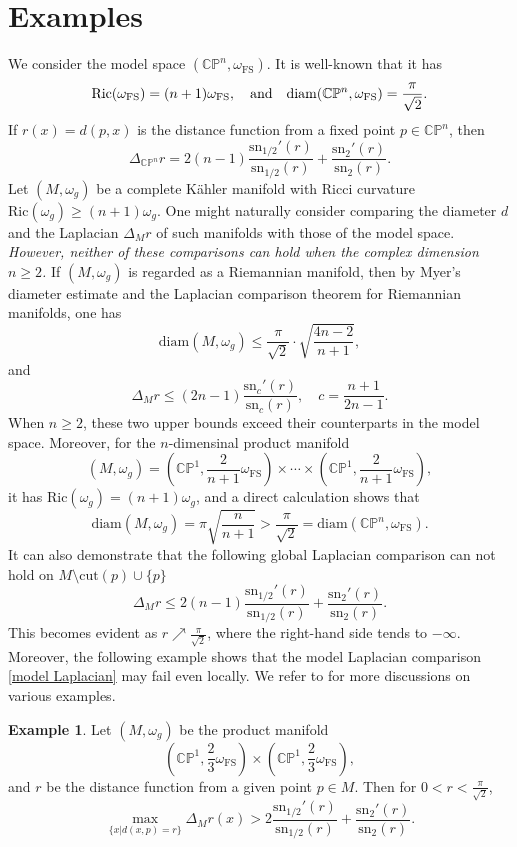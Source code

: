 \documentclass[12pt,reqno]{amsart}
\theoremstyle{plain}
\theoremstyle{definition}
\newtheorem{example}[thm]{Example}
\newcommand{\eexample}{\end{example}}
\newcommand{\bexample}{\begin{example}}
\newcommand{\beq}{\begin{equation}}
\newcommand{\eeq}{\end{equation}}
\newcommand{\qtq}[1]{\quad\mbox{#1}\quad}
\renewcommand{\>}{\rightarrow}
\newcommand{\C}{{\mathbb C}}
\renewcommand{\P}{{\mathbb P}}
\numberwithin{equation}{section} %
\newcommand{\om}{\omega}
\renewcommand{\leq}{\leqslant}
\renewcommand{\geq}{\geqslant}
\begin{document}
\section{Examples}\label{example}
We consider the model space $(\mathbb{C}\mathbb{P}^n, \omega_{\mathrm{FS}})$. It is well-known that it has
\beq \mathrm{Ric}(\omega_{\mathrm{FS}}) =(n+1)\omega_{\mathrm{FS}}, \qtq{\text{and}} \mathrm{diam}(\mathbb{C}\mathbb{P}^n, \omega_{\mathrm{FS}})=\frac{\pi}{\sqrt 2}.\eeq
 If $ r(x) = d(p,x)$ is the distance function from a fixed point $p \in \C\P^n$, then
\beq  \Delta_{\C\P^n} r= 2(n-1)\frac{\mathrm{sn}_{1/2}'( r)}{\mathrm{sn}_{1/2}( r)} + \frac{\mathrm{sn}_{2 }'( r)}{\mathrm{sn}_{2 }( r)}.\eeq
Let $(M,\omega_g)$ be a complete K\"ahler manifold with Ricci curvature $\mathrm{Ric}(\omega_g) \geq (n+1)\omega_g$. One might naturally consider comparing the diameter $d$ and the Laplacian $\Delta_M r$ of such manifolds with those of the model space. \emph{However, neither of these comparisons can hold when the complex dimension $n\geq 2$. }
 If $(M,\omega_g)$ is regarded as a Riemannian manifold, then by Myer's diameter estimate and the Laplacian comparison theorem for Riemannian manifolds, one has
\beq \mathrm{diam}(M,\omega_g)\leq \frac{\pi}{\sqrt 2} \cdot \sqrt{\frac{4n-2}{n+1}},\eeq
 and
\beq \Delta_M r\leq (2n-1)\frac{\mathrm{sn}_c'(r)}{\mathrm{sn}_c(r)}, \quad c=\frac{n+1}{2n-1}.\eeq
 When  $n\geq 2$,  these two upper bounds exceed their counterparts in the model space. Moreover, for the $n$-dimensinal  product manifold
 \beq
 (M,\omega_g) = \left( \C\P^1, \frac{2}{n+1} \omega_{\mathrm{FS}} \right) \times \cdots \times \left( \C\P^1, \frac{2}{n+1} \omega_{\mathrm{FS}} \right),
 \eeq
it has $\mathrm{Ric} (\omega_g)= (n+1)\omega_g$, and a direct calculation shows that
\beq
\mathrm{diam}(M, \omega_g) = \pi \sqrt{\frac{n}{n+1}} > \frac{\pi}{\sqrt{2}} = \mathrm{diam}(\C\P^n, \omega_{\mathrm{FS}}).
\eeq
It can also demonstrate that  the following global Laplacian comparison can not hold on $M\setminus \mathrm{cut}(p)\cup\{p\}$
\beq
\Delta_M r \leq 2(n-1)\frac{\mathrm{sn}_{1/2}'(r)}{\mathrm{sn}_{1/2}(r)} + \frac{\mathrm{sn}_{2 }'(r)}{\mathrm{sn}_{2 }(r)}.\label{model Laplacian}
\eeq
This becomes evident as  $r\nearrow \frac{\pi}{\sqrt{2}}$, where the right-hand side tends to $-\infty$. Moreover, the following example shows that the model Laplacian comparison \eqref{model Laplacian} may fail even locally. We refer to \cite{Liu11, TY12, Liu14, LY18, NZ18} for more discussions on various examples. 

\bexample \label{examplen=2}
Let $(M,\omega_g)$ be the product manifold
\beq
\left(\C\P^{1},\frac{2}{3}\om_{\mathrm{FS}}\right)\times \left(\C\P^{1},\frac{2}{3}\om_{\mathrm{FS}}\right),
\eeq
and $r$ be the distance function from a given point $p\in M$. Then for $0<r<\frac{\pi}{\sqrt{2}}$,
\beq \max_{\{x|d(x,p)=r\}} \Delta_M r(x) >2 \frac{\mathrm{sn}_{1/2}'(r)}{\mathrm{sn}_{1/2}(r)}+\frac{\mathrm{sn}_{2}'(r)}{\mathrm{sn}_{2}(r)}.\label{laplacianrelation1} \eeq
\eexample
\end{document}
